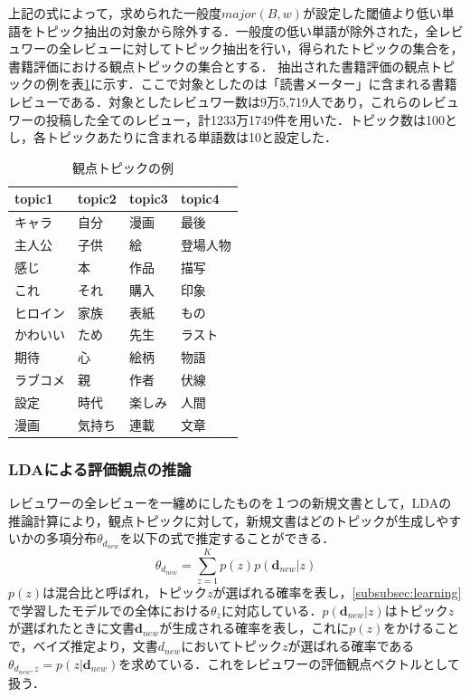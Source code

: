 \documentclass[a4paper,11pt,oneside,openany]{jsbook}
\begin{document}
上記の式によって，求められた一般度$major(B,w)$が設定した閾値より低い単語をトピック抽出の対象から除外する．一般度の低い単語が除外された，全レビュワーの全レビューに対してトピック抽出を行い，得られたトピックの集合を，書籍評価における観点トピックの集合とする．
抽出された書籍評価の観点トピックの例を表\ref{table:topic}に示す．ここで対象としたのは「読書メーター」に含まれる書籍レビューである．対象としたレビュワー数は9万5,719人であり，これらのレビュワーの投稿した全てのレビュー，計1233万1749件を用いた．トピック数は100とし，各トピックあたりに含まれる単語数は10と設定した．
\begin{table}[tb]
  \begin{center}
    \caption{観点トピックの例}
    \label{table:topic} %
    \begin{tabular}{|l|l|l|l|} \hline
      topic1 & topic2 & topic3 & topic4 \\ \hline \hline
      キャラ & 自分 & 漫画 & 最後 \\
      主人公 & 子供 & 絵 & 登場人物 \\
      感じ & 本 & 作品 & 描写 \\
      これ & それ & 購入 & 印象 \\
      ヒロイン & 家族 & 表紙 & もの \\
      かわいい & ため & 先生 & ラスト \\
      期待 & 心 & 絵柄 & 物語 \\
      ラブコメ & 親 & 作者 & 伏線 \\
      設定 & 時代 & 楽しみ & 人間 \\
      漫画 & 気持ち & 連載 & 文章 \\ \hline
    \end{tabular}
  \end{center}
\end{table}

		\subsubsection{LDAによる評価観点の推論}
レビュワーの全レビューを一纏めにしたものを１つの新規文書として，LDAの推論計算により，観点トピックに対して，新規文書はどのトピックが生成しやすいかの多項分布$\theta_{d_{new}}$を以下の式で推定することができる．
\begin{equation}
\theta_{d_{new}} = \sum_{ z=1 }^{K}p(z)p(\mathbf{d}_{new}|z)
\end{equation}
$p(z)$は混合比と呼ばれ，トピック$z$が選ばれる確率を表し，\ref{subsubsec:learning}で学習したモデルでの全体における$\theta_{z}$に対応している．$p(\mathbf{d}_{new}|z)$はトピック$z$が選ばれたときに文書$\mathbf{d}_{new}$が生成される確率を表し，これに$p(z)$をかけることで，ベイズ推定より，文書$d_{new}$においてトピック$z$が選ばれる確率である$\theta_{d_{new},z}=p(z | \mathbf{d}_{new})$を求めている．これをレビュワーの評価観点ベクトルとして扱う．
\end{document}
